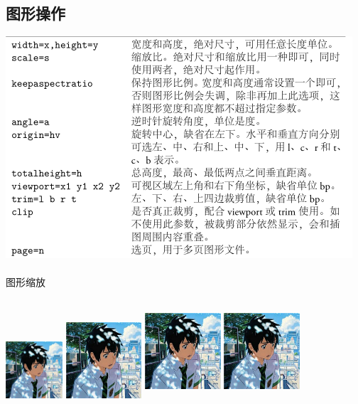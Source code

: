 \documentclass[UTF8]{article}
\begin{document}
\subsection{图形操作}
\includegraphics[scale=1.0]{GraphicalOperation.png}
\\
\\

图形缩放
\\
\\

\includegraphics[width=60pt]{test.jpg}
\includegraphics[width=80pt]{test.jpg}
\includegraphics[width=80pt,height=100pt]{test.jpg}
\includegraphics[width=80pt,height=100pt,keepaspectratio]{test.jpg}
\\
\\
\end{document}
